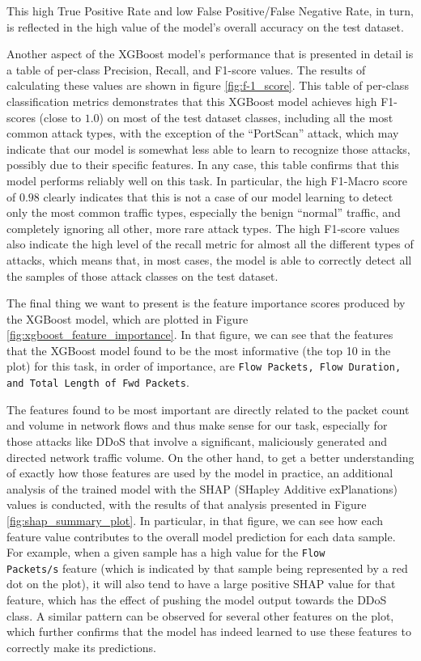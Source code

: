 This high True Positive Rate and low False Positive/False Negative Rate, in turn, is reflected in the high value of the model’s overall accuracy on the test dataset.

Another aspect of the XGBoost model’s performance that is presented in detail is a table of per-class Precision, Recall, and F1-score values. The results of calculating these values are shown in figure \ref{fig:f-1_score}. This table of per-class classification metrics demonstrates that this XGBoost model achieves high F1-scores (close to $1.0$) on most of the test dataset classes, including all the most common attack types, with the exception of the “PortScan” attack, which may indicate that our model is somewhat less able to learn to recognize those attacks, possibly due to their specific features. In any case, this table confirms that this model performs reliably well on this task. In particular, the high F1-Macro score of $0.98$ clearly indicates that this is not a case of our model learning to detect only the most common traffic types, especially the benign “normal” traffic, and completely ignoring all other, more rare attack types. The high F1-score values also indicate the high level of the recall metric for almost all the different types of attacks, which means that, in most cases, the model is able to correctly detect all the samples of those attack classes on the test dataset.

The final thing we want to present is the feature importance scores produced by the XGBoost model, which are plotted in Figure \ref{fig:xgboost_feature_importance}. In that figure, we can see that the features that the XGBoost model found to be the most informative (the top 10 in the plot) for this task, in order of importance, are \texttt{Flow Packets, Flow Duration, and Total Length of Fwd Packets}.

The features found to be most important are directly related to the packet count and volume in network flows and thus make sense for our task, especially for those attacks like DDoS that involve a significant, maliciously generated and directed network traffic volume. On the other hand, to get a better understanding of exactly how those features are used by the model in practice, an additional analysis of the trained model with the SHAP (SHapley Additive exPlanations) values is conducted, with the results of that analysis presented in Figure \ref{fig:shap_summary_plot}. In particular, in that figure, we can see how each feature value contributes to the overall model prediction for each data sample. For example, when a given sample has a high value for the \texttt{Flow\\ Packets/s} feature (which is indicated by that sample being represented by a red dot on the plot), it will also tend to have a large positive SHAP value for that feature, which has the effect of pushing the model output towards the DDoS class. A similar pattern can be observed for several other features on the plot, which further confirms that the model has indeed learned to use these features to correctly make its predictions.


